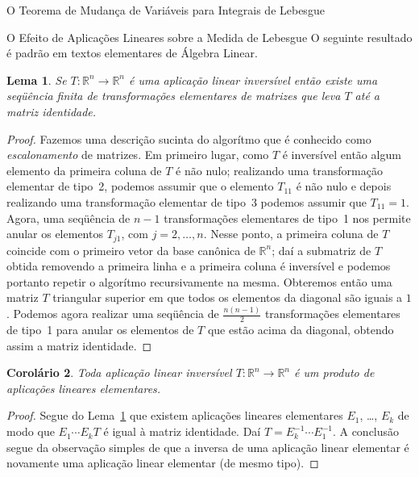\documentclass[oneside,final,11pt]{amsbook}
\newcommand{\R}{\mathds R}
\theoremstyle{remark}\newtheorem{exercise}{Exercício}[chapter]
\theoremstyle{remark}\newtheorem{*exercise}[exercise]{\hbox to 0pt{\hskip 0pt minus 1fil*}Exercício}
\theoremstyle{definition}\newtheorem{exdefin}{Definição}[chapter]
\theoremstyle{plain}\newtheorem{teo}{Teorema}[section]
\theoremstyle{plain}\newtheorem{lem}[teo]{Lema}
\theoremstyle{plain}\newtheorem{prop}[teo]{Proposição}
\theoremstyle{plain}\newtheorem{cor}[teo]{Corolário}
\theoremstyle{definition}\newtheorem{defin}[teo]{Definição}
\theoremstyle{remark}\newtheorem{rem}[teo]{Observação}
\theoremstyle{definition}\newtheorem{notation}[teo]{Notação}
\theoremstyle{definition}\newtheorem{convention}[teo]{Convenção}
\theoremstyle{definition}\newtheorem{example}[teo]{Exemplo}
\numberwithin{section}{chapter}
\numberwithin{equation}{section}
\begin{document}
\begin{chapter}{O Teorema de Mudança de Variáveis para Integrais de Lebesgue}
\begin{section}{O Efeito de Aplicações Lineares sobre a Medida de Lebesgue}
O seguinte resultado é padrão em textos elementares de Álgebra Linear.
\begin{lem}\label{thm:lemaescalona}
Se $T:\R^n\to\R^n$ é uma aplicação linear inversível então existe uma seqüência finita de transformações
elementares de matrizes que leva $T$ até a matriz identidade.
\end{lem}
\begin{proof}
Fazemos uma descrição sucinta do algorítmo que é conhecido como {\em escalonamento\/} de matrizes.
Em primeiro lugar, como $T$ é inversível então algum elemento da primeira coluna de $T$ é não nulo; realizando uma transformação
elementar de tipo~2, podemos assumir que o elemento $T_{11}$ é não nulo e depois realizando uma transformação
elementar de tipo~3 podemos assumir que $T_{11}=1$. Agora, uma seqüência de $n-1$ transformações
elementares de tipo~1 nos permite anular os elementos $T_{j1}$, com $j=2,\ldots,n$. Nesse ponto, a primeira coluna de $T$
coincide com o primeiro vetor da base canônica de $\R^n$; daí a submatriz de $T$ obtida removendo a primeira linha e a
primeira coluna é inversível e podemos portanto repetir o algorítmo recursivamente na mesma. Obteremos então uma matriz
$T$ triangular superior em que todos os elementos da diagonal são iguais a $1$. Podemos agora realizar uma seqüência
de $\frac{n(n-1)}2$ transformações elementares de tipo~1 para anular os elementos de $T$ que estão acima da diagonal,
obtendo assim a matriz identidade.
\end{proof}

\begin{cor}\label{thm:corescalona}
Toda aplicação linear inversível $T:\R^n\to\R^n$ é um produto de aplicações lineares elementares.
\end{cor}
\begin{proof}
Segue do Lema~\ref{thm:lemaescalona} que existem
aplicações lineares elementares $E_1$, \dots, $E_k$ de modo que $E_1\cdots E_kT$ é igual à matriz identidade.
Daí $T=E_k^{-1}\cdots E_1^{-1}$. A conclusão segue da observação simples de que a inversa de uma aplicação linear
elementar é novamente uma aplicação linear elementar (de mesmo tipo).
\end{proof}


\end{section}
\end{chapter}
\end{document}

